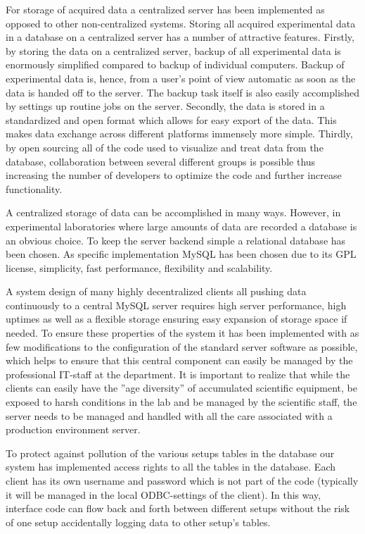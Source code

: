 For storage of acquired data a centralized server has been implemented as
opposed to other non-centralized systems\cite{McIntosh2003}. Storing all
acquired experimental data in a database on a centralized server has a number
of attractive features. Firstly, by storing the data on a centralized server,
backup of all experimental data is enormously simplified compared to backup of
individual computers. Backup of experimental data is, hence, from a user's
point of view automatic as soon as the data is handed off to the server. The
backup task itself is also easily accomplished by settings up routine jobs on
the server. Secondly, the data is stored in a standardized and open format
which allows for easy export of the data. This makes data exchange across
different platforms immensely more simple. Thirdly, by open sourcing all of the
code used to visualize and treat data from the database, collaboration between
several different groups is possible thus increasing the number of developers
to optimize the code and further increase functionality.

A centralized storage of data can be accomplished in many ways. However, in
experimental laboratories where large amounts of data are recorded a database
is an obvious choice. To keep the server backend simple a relational database
has been chosen. As specific implementation MySQL has been chosen due to its
GPL license\cite{gpl}, simplicity, fast performance, flexibility and
scalability.

A system design of many highly decentralized clients all pushing data
continuously to a central MySQL server requires high server performance, high
uptimes as well as a flexible storage ensuring easy expansion of storage space
if needed. To ensure these properties of the system it has been implemented
with as few modifications to the configuration of the standard server software
as possible, which helps to ensure that this central component can easily be
managed by the professional IT-staff at the department. It is important to
realize that while the clients can easily have the ''age diversity'' of
accumulated scientific equipment, be exposed to harsh conditions in the lab and
be managed by the scientific staff, the server needs to be managed
and handled with all the care associated with a production environment server.

To protect against pollution of the various setups tables in the database our
system has implemented access rights to all the tables in the database. Each
client has its own username and password which is not part of the code
(typically it will be managed in the local ODBC-settings of the client). In
this way, interface code can flow back and forth between different setups
without the risk of one setup accidentally logging data to other setup's
tables.


